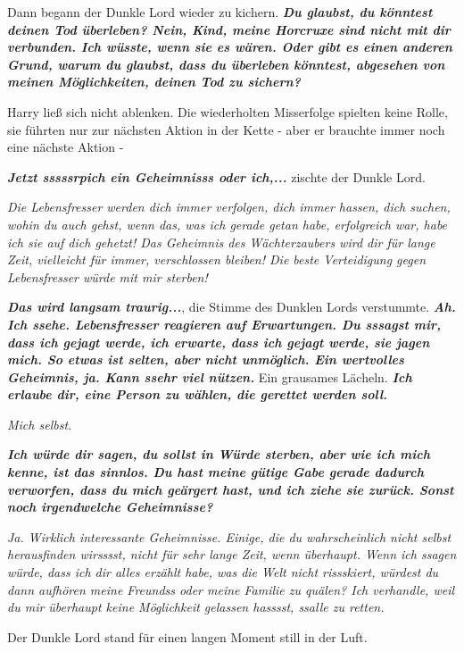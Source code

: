 Dann begann der Dunkle Lord wieder zu kichern. \glqq{}\textbf{\emph{Du glaubst,
du könntest deinen Tod überleben? Nein, Kind, meine Horcruxe sind nicht mit dir
verbunden. Ich wüsste, wenn sie es wären. Oder gibt es einen anderen Grund,
warum du glaubst, dass du überleben könntest, abgesehen von meinen
Möglichkeiten, deinen Tod zu sichern?}}\grqq{}

Harry ließ sich nicht ablenken. Die wiederholten Misserfolge spielten keine
Rolle, sie führten nur zur nächsten Aktion in der Kette - aber er brauchte immer
noch eine nächste Aktion -

\glqq{}\textbf{\emph{Jetzt sssssrpich ein Geheimnisss oder ich,...}}\grqq{}
zischte der Dunkle Lord.

\glqq{}\emph{Die Lebensfresser werden dich immer verfolgen, dich immer hassen,
dich suchen, wohin du auch gehst, wenn das, was ich gerade getan habe,
erfolgreich war, habe ich sie auf dich gehetzt! Das Geheimnis des Wächterzaubers
wird dir für lange Zeit, vielleicht für immer, verschlossen bleiben! Die beste
Verteidigung gegen Lebensfresser würde mit mir sterben!}\grqq{}

\glqq{}\textbf{\emph{Das wird langsam traurig...}}\grqq{}, die Stimme des Dunklen
Lords verstummte. \glqq{}\textbf{\emph{Ah. Ich ssehe. Lebensfresser reagieren auf
Erwartungen. Du sssagst mir, dass ich gejagt werde, ich erwarte, dass ich gejagt
werde, sie jagen mich. So etwas ist selten, aber nicht unmöglich. Ein wertvolles
Geheimnis, ja. Kann ssehr viel nützen.}}\grqq{} Ein grausames Lächeln. \glqq{}
\textbf{\emph{Ich erlaube dir, eine Person zu wählen, die gerettet werden
soll.}}\grqq{}

\glqq{}\emph{Mich selbst.}\grqq{}

\glqq{}\textbf{\emph{Ich würde dir sagen, du sollst in Würde sterben, aber wie
ich mich kenne, ist das sinnlos. Du hast meine gütige Gabe gerade dadurch
verworfen, dass du mich geärgert hast, und ich ziehe sie zurück. Sonst noch
irgendwelche Geheimnisse?}}\grqq{}

\glqq{}\emph{Ja. Wirklich interessante Geheimnisse. Einige, die du wahrscheinlich
nicht selbst herausfinden wirsssst, nicht für sehr lange Zeit, wenn überhaupt.
Wenn ich ssagen würde, dass ich dir alles erzählt habe, was die Welt nicht
rissskiert, würdest du dann aufhören meine Freundss oder meine Familie zu
quälen? Ich verhandle, weil du mir überhaupt keine Möglichkeit gelassen hasssst,
ssalle zu retten.}\grqq{}

Der Dunkle Lord stand für einen langen Moment still in der Luft.


